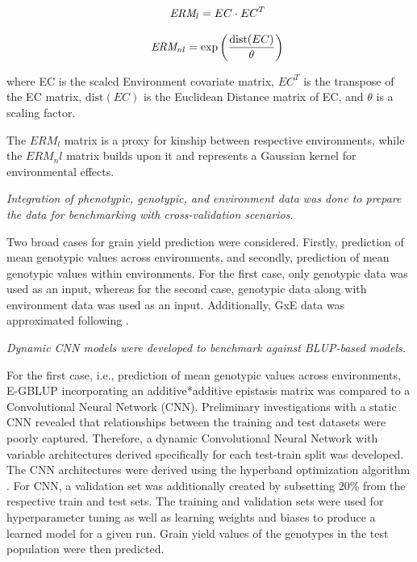 \documentclass[english, biblatex]{lni}
\begin{document}
\begin{equation}
\hspace{0.5cm}\textit{ERM}_l = EC \cdot EC^T
\end{equation}

\vspace{6pt}

\begin{equation}
\hspace{0.5cm}\textit{ERM}_{nl} = \exp\left(\frac{{\text{dist}(EC)}}{\theta}\right)
\end{equation}

\vspace{6pt}

where EC is the scaled Environment covariate matrix, $EC^T$ is the transpose of the EC matrix, $\text{dist}(EC)$ is the Euclidean Distance matrix of EC, and $\theta$ is a scaling factor.

The $\textit{ERM}_l$ matrix is a proxy for kinship between respective environments, while the $\textit{ERM}_nl$ matrix builds upon it and represents a Gaussian kernel for environmental effects.

\textit{Integration of phenotypic, genotypic, and environment data was done to prepare the data for benchmarking with cross-validation scenarios.}

Two broad cases for grain yield prediction were considered. Firstly, prediction of mean genotypic values across environments, and secondly, prediction of mean genotypic values within environments. For the first case, only genotypic data was used as an input, whereas for the second case, genotypic data along with environment data was used as an input. Additionally, GxE data was approximated following \cite{de2020data}.

\textit{Dynamic CNN models were developed to benchmark against BLUP-based models.}

For the first case, i.e., prediction of mean genotypic values across environments, E-GBLUP incorporating an additive*additive epistasis matrix \cite{jiang2015modeling} was compared to a Convolutional Neural Network (CNN). Preliminary investigations with a static CNN revealed that relationships between the training and test datasets were poorly captured. Therefore, a dynamic Convolutional Neural Network with variable architectures derived specifically for each test-train split was developed. The CNN architectures were derived using the hyperband optimization algorithm \cite{li_hyperband_2018}. For CNN, a validation set was additionally created by subsetting 20\% from the respective train and test sets. The training and validation sets were used for hyperparameter tuning as well as learning weights and biases to produce a learned model for a given run. Grain yield values of the genotypes in the test population were then predicted.
\end{document}
